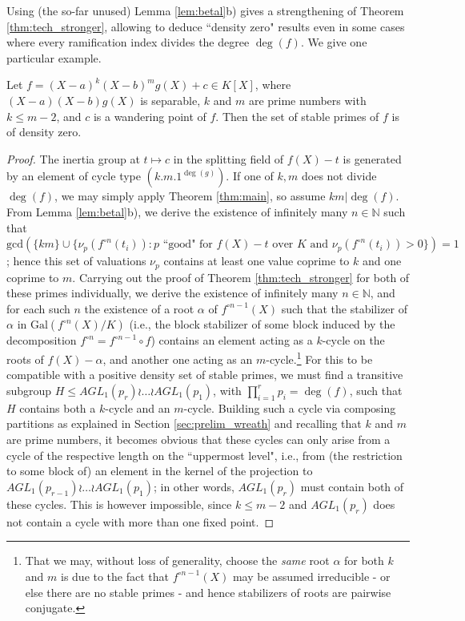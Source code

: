 \documentclass[a4paper]{amsart}
\begin{document}
  

  Using (the so-far unused) Lemma \ref{lem:betal}b) gives a strengthening of Theorem \ref{thm:tech_stronger}, allowing to deduce ``density zero" results even in some cases  where every ramification index divides the degree $\deg(f)$. We give one particular example.
  \begin{lemma}
  \label{lem:more_ex} Let $f=(X-a)^k(X-b)^mg(X)+c\in K[X]$, where $(X-a)(X-b)g(X)$ is separable, 
   $k$ and $m$ are prime numbers with $k\le m-2$, and $c$ is a wandering point of $f$. Then the set of stable primes of $f$ is of density zero.
   \end{lemma}
   \begin{proof} The inertia group at $t\mapsto c$ in the splitting field of $f(X)-t$ is generated by an element of cycle type $(k.m.1^{\deg(g)})$. If one of $k,m$ does not divide $\deg(f)$, we may simply apply Theorem \ref{thm:main}, so assume $km|\deg(f)$. From 
  Lemma \ref{lem:betal}b), we derive the existence of infinitely many $n\in \mathbb{N}$ such that $\mathrm{gcd}(\{km\}\cup \{\nu_p(f^{\circ n}(t_i)): p \text{\ ``good" for $f(X)-t$ over $K$} \text{ and } \nu_p(f^{\circ n}(t_i)) > 0\}) = 1$; hence this set of valuations $\nu_p$ contains at least one value coprime to $k$ and one coprime to $m$.
  Carrying out the proof of Theorem \ref{thm:tech_stronger} for both of these primes individually, we derive the existence of infinitely many $n\in \mathbb{N}$, and for each such $n$ the existence of a root $\alpha$ of $f^{\circ n-1}(X)$ such that the stabilizer of $\alpha$ in $\textrm{Gal}(f^{\circ n}(X)/K)$ (i.e., the block stabilizer of some block induced by the decomposition $f^{\circ n} = f^{\circ n-1}\circ f$) contains an element acting as a $k$-cycle on the roots of $f(X)-\alpha$, and another one acting as an $m$-cycle.\footnote{That we may, without loss of generality, choose the {\it same} root $\alpha$ for both $k$ and $m$ is due to the fact that $f^{\circ n-1}(X)$ may be assumed irreducible - or else there are no stable primes - and hence stabilizers of roots are pairwise conjugate.}  For this to be compatible with a positive density set of stable primes, we must find a transitive subgroup $H\le AGL_1(p_r)\wr\dots\wr AGL_1(p_1)$, with $\prod_{i=1}^r p_i = \deg(f)$, such that $H$ contains both a $k$-cycle and an $m$-cycle. Building such a cycle via composing partitions as explained in Section \ref{sec:prelim_wreath} and recalling that $k$ and $m$ are prime numbers, it becomes obvious that these cycles can only arise from a cycle of the respective length on the ``uppermost level", i.e., from (the restriction to some block of) an element in the kernel of the projection to  $AGL_1(p_{r-1})\wr\dots\wr AGL_1(p_1)$; in other words, $AGL_1(p_r)$ must contain both of these cycles. This is however impossible, since $k\le m-2$ and $AGL_1(p_r)$ does not contain a cycle with more than one fixed point.
  \end{proof}
  
\end{document}

